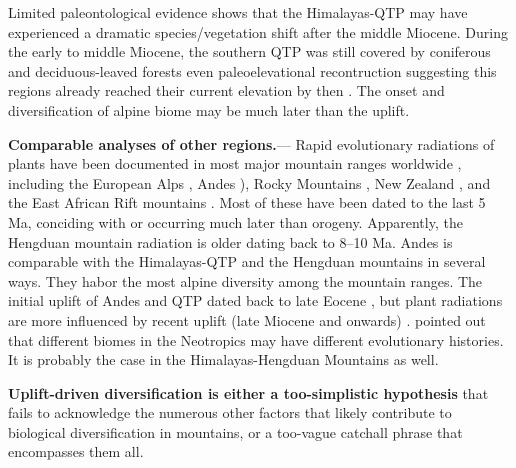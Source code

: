 
Limited paleontological evidence shows that the Himalayas-QTP may have experienced a dramatic species/vegetation shift after the middle Miocene. During the early to middle Miocene, the southern QTP was still covered by coniferous and deciduous-leaved forests \citep{SunJ2014,LiH1976} even paleoelevational recontruction suggesting this regions already reached their current elevation by then \citep{Spicer2003}. The onset and diversification of alpine biome may be much later than the uplift.


\textbf{Comparable analyses of other regions.}---%
Rapid evolutionary radiations of plants have been documented in most major mountain ranges worldwide \citep[reviewed in][]{Hughes2015}, including the European Alps \citep{Roquet2013}, Andes \citep[e.g.][]{Hughes2006,Luebert2014}), Rocky Mountains \citep{DrummondC2012}, New Zealand \citep{Joly2014}, and the East African Rift mountains \citep{Linder2014}. Most of these have been dated to the last 5 Ma, conciding with or occurring much later than orogeny. Apparently, the Hengduan mountain radiation is older dating back to 8--10 Ma. Andes is comparable with the Himalayas-QTP and the Hengduan mountains in several ways. They habor the most alpine diversity among the mountain ranges. The initial uplift of Andes and QTP dated back to late Eocene \citep{Gregory-Wodzicki2000,Graham2009}, but plant radiations are more influenced by recent uplift (late Miocene and onwards) \citep{Hughes2013,Luebert2014,Hughes2015,Madrinan2013}. \citet{HughesC2013} pointed out that different biomes in the Neotropics may have different evolutionary histories. It is probably the case in the Himalayas-Hengduan Mountains as well. 


\textbf{Uplift-driven diversification is either a too-simplistic hypothesis} that fails to acknowledge the numerous other factors that likely contribute to biological diversification in mountains, or a too-vague catchall phrase that encompasses them all.

